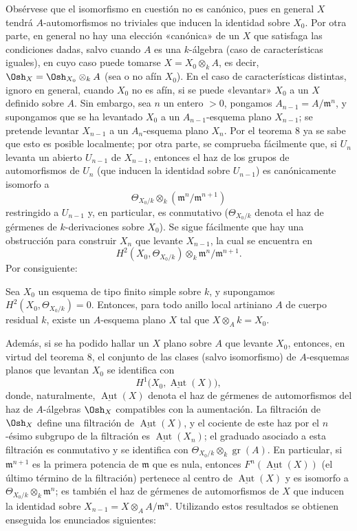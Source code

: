 Obsérvese que el isomorfismo en cuestión no es canónico, pues en general $X$
tendrá $A$-automorfismos no triviales que inducen la identidad sobre $X_0$. Por
otra parte, en general no hay una elección «canónica» de un $X$ que satisfaga
las condiciones dadas, salvo cuando $A$ es una $k$-álgebra (caso de
características iguales), en cuyo caso puede tomarse $X=X_0\otimes_k A$, es
decir, $\Osh_X=\Osh_{X_0}\otimes_k A$ (sea o no afín $X_0$). En el caso de
características distintas, ignoro en general, cuando $X_0$ no es afín, si se
puede «levantar» $X_0$ a un $X$ definido sobre $A$. Sin embargo, sea $n$ un
entero $>0$, pongamos $A_{n-1}=A/\mathfrak m^n$, y supongamos que se ha
levantado $X_0$ a un $A_{n-1}$-esquema plano $X_{n-1}$; se pretende levantar
$X_{n-1}$ a un $A_n$-esquema plano $X_n$. Por el teorema 8 ya se sabe que esto
es posible localmente; por otra parte, se comprueba fácilmente que, si $U_n$
levanta un abierto $U_{n-1}$ de $X_{n-1}$, entonces el haz de los grupos de
automorfismos de $U_n$ (que inducen la identidad sobre $U_{n-1}$) es
canónicamente isomorfo a
\[
  \Theta_{X_0/k}\otimes_k(\mathfrak m^n/\mathfrak m^{n+1})
\]
restringido a $U_{n-1}$ y, en particular, es conmutativo
($\Theta_{X_0/k}$ denota el haz de gérmenes de $k$-derivaciones sobre $X_0$).
Se sigue fácilmente que hay una obstrucción para construir $X_n$ que levante
$X_{n-1}$, la cual se encuentra en
\[
  H^2(X_0,\Theta_{X_0/k})\otimes_k
  \mathfrak m^n/\mathfrak m^{n+1}.
\]
Por consiguiente:

 Sea $X_0$ un esquema de tipo finito simple sobre $k$, y
supongamos $H^2(X_0,\Theta_{X_0/k})=0$. Entonces, para todo anillo local
artiniano $A$ de cuerpo residual $k$, existe un $A$-esquema plano $X$ tal que
$X\otimes_A k=X_0$.

Además, si se ha podido hallar un $X$ plano sobre $A$ que levante $X_0$,
entonces, en virtud del teorema 8, el conjunto de las clases (salvo isomorfismo)
de $A$-esquemas planos que levantan $X_0$ se identifica con
\[
  H^1\bigl(X_0,\underline{\operatorname{Aut}}(X)\bigr),
\]
donde, naturalmente, $\underline{\operatorname{Aut}}(X)$ denota el haz de
gérmenes de automorfismos del haz de $A$-álgebras $\Osh_X$ compatibles con la
aumentación. La filtración de $\Osh_X$ define una filtración de
$\underline{\operatorname{Aut}}(X)$, y el cociente de este haz por el $n$-ésimo
subgrupo de la filtración es $\underline{\operatorname{Aut}}(X_n)$; el graduado
asociado a esta filtración es conmutativo y se identifica con
$\Theta_{X_0/k}\otimes_k\operatorname{gr}(A)$. En particular, si
$\mathfrak m^{n+1}$ es la primera potencia de $\mathfrak m$ que es nula,
entonces $F^n(\underline{\operatorname{Aut}}(X))$ (el último término de la
filtración) pertenece al centro de $\underline{\operatorname{Aut}}(X)$ y es
isomorfo a $\Theta_{X_0/k}\otimes_k\mathfrak m^n$; es también el haz de
gérmenes de automorfismos de $X$ que inducen la identidad sobre
$X_{n-1}=X\otimes_A A/\mathfrak m^n$. Utilizando estos resultados se obtienen
enseguida los enunciados siguientes:

